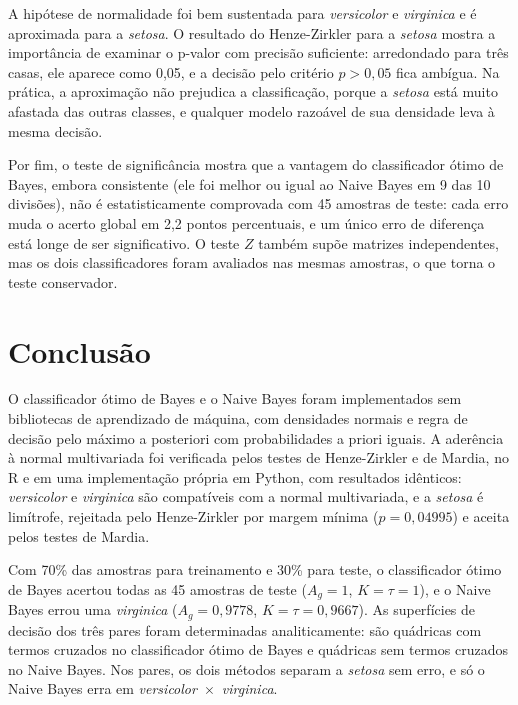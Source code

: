 \documentclass[12pt,a4paper]{article}
\newcommand{\setosa}{\emph{setosa}}
\newcommand{\versicolor}{\emph{versicolor}}
\newcommand{\virginica}{\emph{virginica}}
\begin{document}
A hipótese de normalidade foi bem sustentada para \versicolor{} e \virginica{} e é aproximada para a \setosa{}. O resultado do Henze-Zirkler para a \setosa{} mostra a importância de examinar o p-valor com precisão suficiente: arredondado para três casas, ele aparece como 0,05, e a decisão pelo critério $p > 0{,}05$ fica ambígua. Na prática, a aproximação não prejudica a classificação, porque a \setosa{} está muito afastada das outras classes, e qualquer modelo razoável de sua densidade leva à mesma decisão.

Por fim, o teste de significância mostra que a vantagem do classificador ótimo de Bayes, embora consistente (ele foi melhor ou igual ao Naive Bayes em 9 das 10 divisões), não é estatisticamente comprovada com 45 amostras de teste: cada erro muda o acerto global em 2,2 pontos percentuais, e um único erro de diferença está longe de ser significativo. O teste $Z$ também supõe matrizes independentes, mas os dois classificadores foram avaliados nas mesmas amostras, o que torna o teste conservador.

\section{Conclusão}

O classificador ótimo de Bayes e o Naive Bayes foram implementados sem bibliotecas de aprendizado de máquina, com densidades normais e regra de decisão pelo máximo a posteriori com probabilidades a priori iguais. A aderência à normal multivariada foi verificada pelos testes de Henze-Zirkler e de Mardia, no R e em uma implementação própria em Python, com resultados idênticos: \versicolor{} e \virginica{} são compatíveis com a normal multivariada, e a \setosa{} é limítrofe, rejeitada pelo Henze-Zirkler por margem mínima ($p = 0{,}04995$) e aceita pelos testes de Mardia.

Com 70\% das amostras para treinamento e 30\% para teste, o classificador ótimo de Bayes acertou todas as 45 amostras de teste ($A_g = 1$, $K = \tau = 1$), e o Naive Bayes errou uma \virginica{} ($A_g = 0{,}9778$, $K = \tau = 0{,}9667$). As superfícies de decisão dos três pares foram determinadas analiticamente: são quádricas com termos cruzados no classificador ótimo de Bayes e quádricas sem termos cruzados no Naive Bayes. Nos pares, os dois métodos separam a \setosa{} sem erro, e só o Naive Bayes erra em \versicolor{}~$\times$~\virginica{}.
\end{document}
